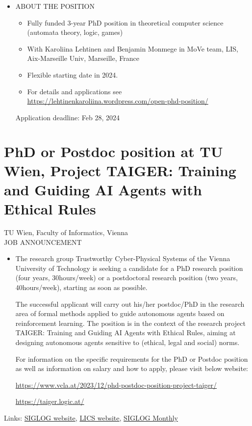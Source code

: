 \documentclass[prodmode,acmtecs]{acmsmall} %
\begin{document}
\begin{itemize}\item  ABOUT THE POSITION 
 
\begin{itemize}\item  Fully funded 3-year PhD position in theoretical computer science (automata theory, logic, games)
\item  With Karoliina Lehtinen and Benjamin Monmege in MoVe team, LIS, Aix-Marseille Univ, Marseille, France
\item  Flexible starting date in 2024.
\item  For details and applications see \href{https://lehtinenkaroliina.wordpress.com/open-phd-position/}{https://lehtinenkaroliina.wordpress.com/open-phd-position/}
\end{itemize} 
Application deadline: Feb 28, 2024 
 
\end{itemize}\section{PhD or Postdoc position at TU Wien, Project TAIGER: Training and Guiding AI Agents with Ethical Rules}\label{PhDorPostdocpositionatTUWienProjectTAIGER}  TU Wien, Faculty of Informatics, Vienna\\ 
JOB ANNOUNCEMENT 

\begin{itemize}\item  The research group Trustworthy Cyber-Physical Systems of the Vienna University of Technology is seeking a candidate for a PhD research position (four years, 30hours/week) or a postdoctoral research position (two years, 40hours/week), starting as soon as possible. 
 
  The successful applicant will carry out his/her postdoc/PhD in the research area of formal methods applied to guide autonomous agents based on reinforcement learning. The position is in the context of the research project TAIGER: Training and Guiding AI Agents with Ethical Rules, aiming at designing autonomous agents sensitive to (ethical, legal and social) norms. 
 
  For information on the specific requirements for the PhD or Postdoc position as well as information on salary and how to apply, please visit below website: 
 
  \href{https://www.vcla.at/2023/12/phd-postdoc-position-project-taiger/}{https://www.vcla.at/2023/12/phd-postdoc-position-project-taiger/} 
 
  \href{https://taiger.logic.at/}{https://taiger.logic.at/} 
 
\end{itemize}


\bigskip Links: \href{http://siglog.org/}{SIGLOG website}, \href{https://lics.siglog.org}{LICS website}, \href{https://lics.siglog.org/newsletters/}{SIGLOG Monthly}
\end{document}
